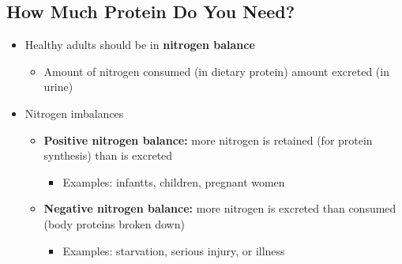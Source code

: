 \documentclass[12pt]{article}
\begin{document}
        \subsection{How Much Protein Do You Need?}
            \begin{itemize}
                \item Healthy adults should be in \textbf{nitrogen balance}
                    \begin{itemize}
                        \item Amount of nitrogen consumed (in dietary protein) amount excreted (in urine)
                    \end{itemize}
                \item Nitrogen imbalances
                    \begin{itemize}
                        \item \textbf{Positive nitrogen balance:} more nitrogen is retained (for protein synthesis) than is excreted
                            \begin{itemize}
                                \item Examples: infantts, children, pregnant women
                            \end{itemize}
                        \item \textbf{Negative nitrogen balance:} more nitrogen is excreted than consumed (body proteins broken down)
                            \begin{itemize}
                                \item Examples: starvation, serious injury, or illness
                            \end{itemize}
                    \end{itemize}
            \end{itemize}
\end{document}
